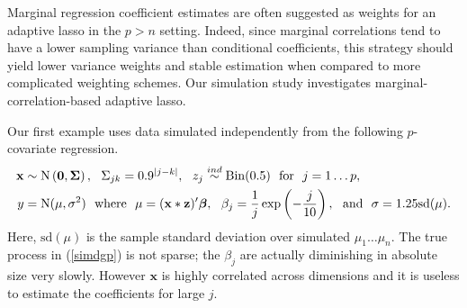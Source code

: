 \documentclass[12pt]{article}
\newcommand{\bs}[1]{\boldsymbol{#1}}
\newcommand{\mr}[1]{\mathrm{#1}}
\newcommand{\bm}[1]{\mathbf{#1}}
\begin{document}
Marginal regression coefficient estimates are often \citep[e.g.,][]{huang_adaptive_2008} suggested as weights for an adaptive lasso in the $p>n$ setting.  Indeed, since marginal correlations tend to have a lower sampling variance than conditional coefficients, this strategy should yield lower variance weights and stable estimation when compared to more complicated weighting schemes.  Our simulation study investigates marginal-correlation-based adaptive lasso.

Our first example uses data simulated independently from the following
$p$-covariate regression.
\begin{align}
\label{simdgp}
\bm{x} &\sim \mr{N}\left(\bm{0},\bs{\Sigma}\right),~~\Sigma_{jk} = 0.9^{|j-k|},~~z_{j} \stackrel{ind}{\sim} \mr{Bin}(0.5)~~\text{for}~~j=1\ldots p,
 \\
y &= \mr{N}(\mu,\sigma^2)~~\text{where}~~\mu = (\bm{x}*\bm{z})'\bs{\beta},~~\beta_j = \frac{1}{j}\exp\left(-\frac{j}{10}\right),~~\text{and}
~~\sigma=1.25\mr{sd}(\mu).\notag
\end{align}
Here, $\mr{sd}(\mu)$ is the sample standard deviation over simulated $\mu_1\ldots\mu_n$.  The true process in (\ref{simdgp}) is not sparse; the $\beta_j$ are actually diminishing in absolute size very slowly.  However $\bm{x}$ is highly
correlated across dimensions and it is useless to estimate the coefficients
for large $j$.  
\end{document}
